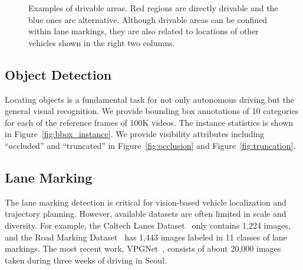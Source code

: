 \begin{figure*}[tp]
    \centering
    \caption{\small Examples of drivable areas. Red regions are directly drivable and the blue ones are alternative. Although drivable areas can be confined within lane markings, they are also related to locations of other vehicles shown in the right two columns.\vspace{-4mm}}
    \label{fig:drivable_examples}
\end{figure*}

\subsection{Object Detection}
Locating objects is a fundamental task for not only autonomous driving but the general visual recognition.
We provide bounding box annotations of 10 categories for each of the reference frames of 100K videos. The instance statistics is shown in Figure~\ref{fig:bbox_instance}. We provide visibility
attributes including ``occluded'' and ``truncated'' in Figure~\ref{fig:occlusion} and
Figure~\ref{fig:truncation}. 

\subsection{Lane Marking}

The lane marking detection is critical for vision-based vehicle localization and trajectory planning. However,
available datasets are often limited in scale and diversity. For example, the Caltech Lanes
Dataset~\cite{Aly2008Real} only contains 1,224 images, and the Road Marking Dataset~\cite{Wu2012A} has 1,443
images labeled in 11 classes of lane markings. The most recent work, VPGNet~\cite{lee2017vpgnet}, consists of
about 20,000 images taken during three weeks of driving in Seoul. 

